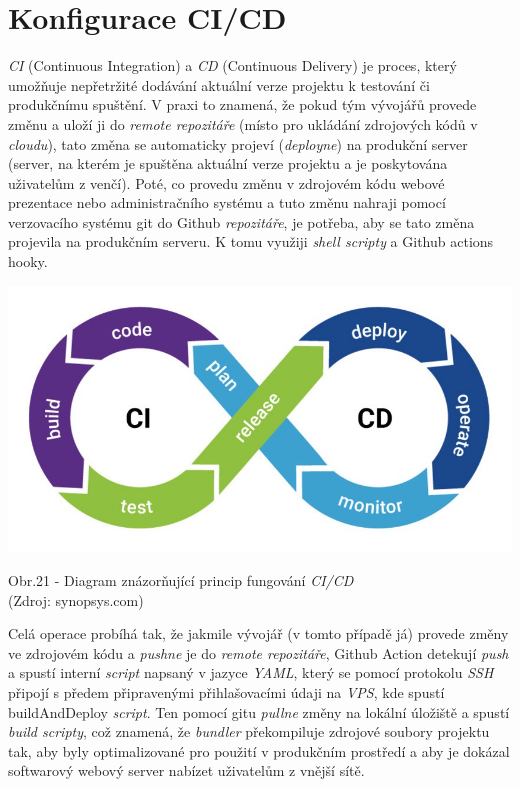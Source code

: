 \documentclass[12pt,a4paper]{report}
\begin{document}
  \section{Konfigurace CI/CD}
  \emph{CI} (Continuous Integration) a \emph{CD} (Continuous Delivery) je proces, který umožňuje nepřetržité 
  dodávání aktuální verze projektu k testování či produkčnímu spuštění. V praxi to znamená,
  že pokud tým vývojářů provede změnu a uloží ji do \emph{remote repozitáře}
  (místo pro ukládání zdrojových kódů v \emph{cloudu}), tato změna se automaticky projeví (\emph{deployne})
  na produkční server (server, na kterém je spuštěna aktuální verze projektu a je poskytována
  uživatelům z venčí).
  Poté, co provedu změnu v zdrojovém kódu webové prezentace nebo administračního systému a 
  tuto změnu nahraji pomocí verzovacího systému git do Github \emph{repozitáře}, je potřeba, aby se 
  tato změna projevila na produkčním serveru. K tomu využiji \emph{shell scripty} a Github actions hooky.

  \vspace*{0.5cm}
  \noindent\includegraphics[width=\linewidth]{CICD.jpg}
  \begin{center}
    Obr.21 - Diagram znázorňující princip fungování \emph{CI/CD}   \\
    (Zdroj: synopsys.com)
  \end{center}
  \vspace*{0.5cm}

  Celá operace probíhá tak, že jakmile vývojář (v tomto případě já) provede změny ve zdrojovém kódu
  a \emph{pushne} je do \emph{remote repozitáře}, Github Action detekují \emph{push} a spustí interní \emph{script} napsaný
  v jazyce \emph{YAML}, který se pomocí protokolu \emph{SSH} připojí s předem připravenými přihlašovacími
  údaji  na \emph{VPS}, kde spustí buildAndDeploy \emph{script}. Ten pomocí gitu \emph{pullne} změny na lokální úložiště 
  a spustí \emph{build scripty}, což znamená, že \emph{bundler} překompiluje zdrojové soubory projektu tak, aby byly 
  optimalizované pro použití v produkčním prostředí a aby je dokázal softwarový webový server nabízet uživatelům z vnější sítě.
  
\end{document}
